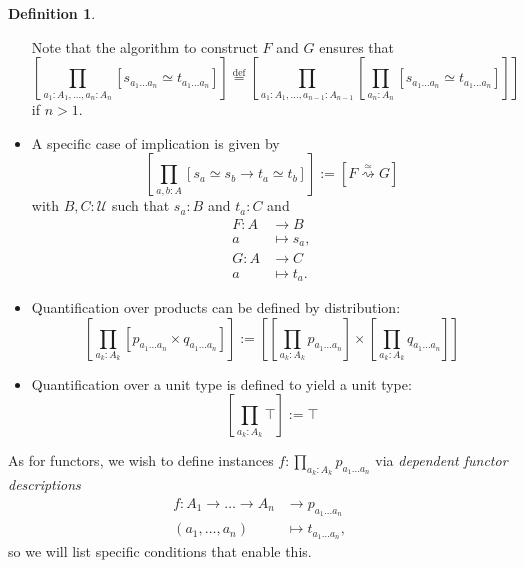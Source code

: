 \documentclass[a4paper]{article}
\theoremstyle{definition}
\newtheorem{definition}{Definition}[section]
\theoremstyle{remark}
\newcommand{\defn}{\emph}
\newcommand{\eqDef}{\overset{\text{def}}{=}}
\renewcommand{\equiv}{\simeq}
\newcommand{\equivto}{\overset{\equiv}{\rightsquigarrow}}
\newcommand{\U}{\mathcal{U}}
\begin{document}
\begin{definition}
\begin{itemize}
    Note that the algorithm to construct $F$ and $G$ ensures that
    \[\left[\prod_{a_1 : A_1, \dots, a_n : A_n} [s_{a_1 \dots a_n} \equiv t_{a_1 \dots a_n}]\right] \eqDef
      \left[\prod_{a_1 : A_1, \dots, a_{n-1} : A_{n-1}} \left[\prod_{a_n : A_n} [s_{a_1 \dots a_n} \equiv t_{a_1 \dots a_n}]\right]\right]\]
    if $n > 1.$
    \item A specific case of implication is given by
    \[\left[\prod_{a,b : A} [s_a \equiv s_b \to t_a \equiv t_b]\right] := [F \equivto G]\]
    with $B,C : \U$ such that $s_a : B$ and $t_a : C$ and
    \begin{align*}
      F : A &\to     B\\
          a &\mapsto s_a,\\[1ex]
      G : A &\to     C\\
          a &\mapsto t_a.
    \end{align*}
    \item Quantification over products can be defined by distribution:
    \[\left[\prod_{a_k : A_k} [p_{a_1 \dots a_n} \times q_{a_1 \dots a_n}]\right] :=
      \left[\left[\prod_{a_k : A_k} p_{a_1 \dots a_n}\right] \times
            \left[\prod_{a_k : A_k} q_{a_1 \dots a_n}\right]\right]\]
    \item Quantification over a unit type is defined to yield a unit type:
    \[\left[\prod_{a_k : A_k} \top\right] := \top\]
  \end{itemize}
\end{definition}

As for functors, we wish to define instances $f : \prod_{a_k : A_k} p_{a_1 \dots a_n}$ via
\defn{dependent functor descriptions}
\begin{align*}
  f : A_1 \to \dots \to A_n &\to     p_{a_1 \dots a_n}\\
      (a_1,\dots,a_n)       &\mapsto t_{a_1 \dots a_n},
\end{align*}
so we will list specific conditions that enable this.
\end{document}
